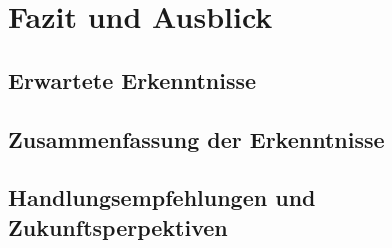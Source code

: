 \chapter{Fazit und Ausblick}

\section{Erwartete Erkenntnisse}


\section{Zusammenfassung der Erkenntnisse}


\section{Handlungsempfehlungen und Zukunftsperpektiven}
